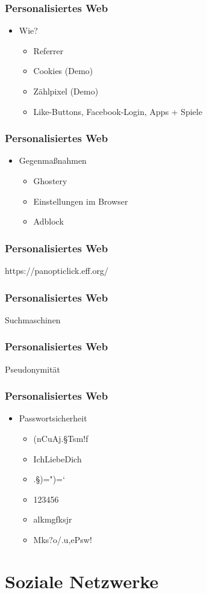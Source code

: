 \documentclass[12pt]{beamer}
\begin{document}
\begin{frame}
  \frametitle{Personalisiertes Web}
  \begin{itemize}
    \item<1-> Wie?
      \begin{itemize}
        \item<2-> Referrer
        \item<3-> Cookies (Demo)
        \item<4-> Zählpixel (Demo)
        \item<5-> Like-Buttons, Facebook-Login, Apps + Spiele
      \end{itemize}
  \end{itemize}
\end{frame}

\begin{frame}
  \frametitle{Personalisiertes Web}
  \begin{itemize}
    \item<1-> Gegenmaßnahmen 
      \begin{itemize}
        \item<2-> Ghostery
        \item<3-> Einstellungen im Browser
        \item<4-> Adblock
      \end{itemize}
  \end{itemize}
\end{frame}

\begin{frame}
  \frametitle{Personalisiertes Web}
  \begin{center} \Large
    https://panopticlick.eff.org/
  \end{center}
\end{frame}

\begin{frame}
  \frametitle{Personalisiertes Web}
  \begin{center} \Large
    Suchmaschinen
  \end{center}
\end{frame}

\begin{frame}
  \frametitle{Personalisiertes Web}
  \begin{center} \Large
     Pseudonymität
  \end{center}
\end{frame}

\begin{frame}
  \frametitle{Personalisiertes Web}
  \begin{itemize}
    \item Passwortsicherheit 
      \begin{itemize}
        \item (nCuAj.§Tsm!f
        \item IchLiebeDich
        \item .§)=")=`
        \item 123456
        \item alkmgfksjr
        \item Mks?o/.u,ePsw!
      \end{itemize}
  \end{itemize}
\end{frame}

\section{Soziale Netzwerke}
\end{document}
